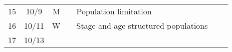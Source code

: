 \documentclass[]{article}
\begin{document}
\begin{longtable}[]{@{}cccllll@{}}
\begin{minipage}[t]{0.12\columnwidth}
15\strut
\end{minipage} & \begin{minipage}[t]{0.08\columnwidth}\centering\strut
10/9\strut
\end{minipage} & \begin{minipage}[t]{0.07\columnwidth}\centering\strut
M\strut
\end{minipage} & \begin{minipage}[t]{0.10\columnwidth}\raggedright\strut
\strut
\end{minipage} & \begin{minipage}[t]{0.11\columnwidth}\raggedright\strut
Population limitation\strut
\end{minipage} & \begin{minipage}[t]{0.11\columnwidth}\raggedright\strut
\strut
\end{minipage} & \begin{minipage}[t]{0.16\columnwidth}\raggedright\strut
\strut
\end{minipage}\tabularnewline
\begin{minipage}[t]{0.12\columnwidth}\centering\strut
16\strut
\end{minipage} & \begin{minipage}[t]{0.08\columnwidth}\centering\strut
10/11\strut
\end{minipage} & \begin{minipage}[t]{0.07\columnwidth}\centering\strut
W\strut
\end{minipage} & \begin{minipage}[t]{0.10\columnwidth}\raggedright\strut
\strut
\end{minipage} & \begin{minipage}[t]{0.11\columnwidth}\raggedright\strut
Stage and age structured populations\strut
\end{minipage} & \begin{minipage}[t]{0.11\columnwidth}\raggedright\strut
\strut
\end{minipage} & \begin{minipage}[t]{0.16\columnwidth}\raggedright\strut
\strut
\end{minipage}\tabularnewline
\begin{minipage}[t]{0.12\columnwidth}\centering\strut
17\strut
\end{minipage} & \begin{minipage}[t]{0.08\columnwidth}\centering\strut
10/13\strut
\end{minipage} & \begin{minipage}[t]{0.07\columnwidth}\centering\strut

\end{minipage}
\end{longtable}
\end{document}
